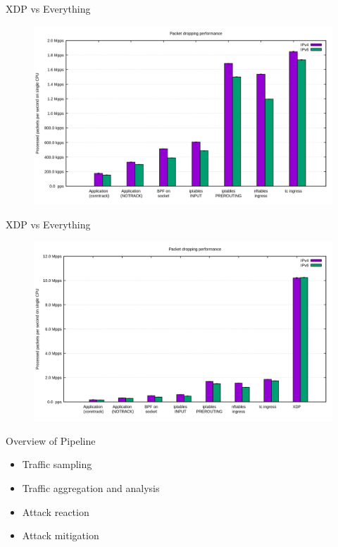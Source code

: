 \documentclass{beamer}
\begin{document}
\begin{frame}{XDP vs Everything}
  \begin{figure}
    \includegraphics[width=1.1\textwidth]{./no_xdp.png}
  \end{figure}
\end{frame}

\begin{frame}{XDP vs Everything}
  \begin{figure}
    \includegraphics[width=1.1\textwidth]{./with_xdp.png}
  \end{figure}
\end{frame}

\begin{frame}{Overview of Pipeline}
  \begin{itemize}
    \item Traffic sampling
    \item Traffic aggregation and analysis
    \item Attack reaction
    \item Attack mitigation
  \end{itemize}
\end{frame}
\end{document}
